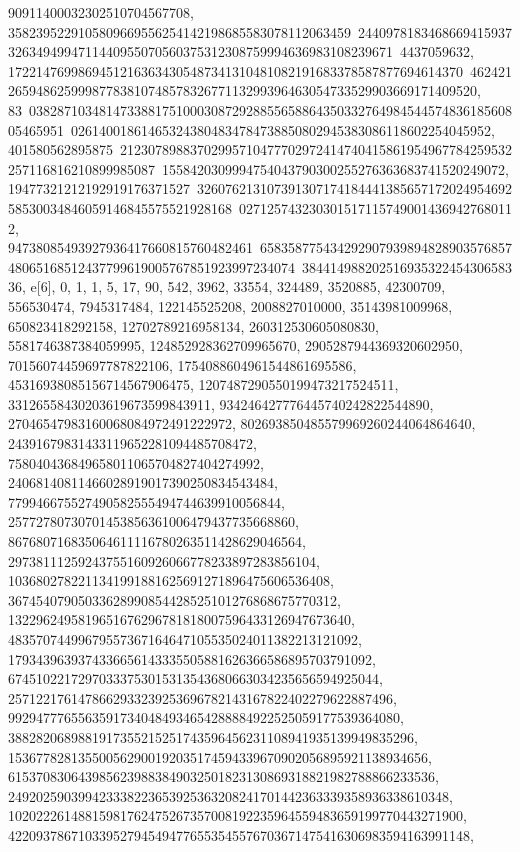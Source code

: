 {{{90911400032302510704567708, 3582395229105809669556254142198685583078112063459\
24409781834686694159373263494994711440955070560375312308759994636983108239671\
4437059632, 17221476998694512163634305487341310481082191683378587877694614370\
4624212659486259998778381074857832677113299396463054733529903669171409520, 83\
03828710348147338817510003087292885565886435033276498454457483618560805465951\
026140018614653243804834784738850802945383086118602254045952, 401580562895875\
21230789883702995710477702972414740415861954967784259532257116816210899985087\
1558420309994754043790300255276363683741520249072, 19477321212192919176371527\
32607621310739130717418444138565717202495469258530034846059146845575521928168\
0271257432303015171157490014369427680112, 94738085493927936417660815760482461\
65835877543429290793989482890357685748065168512437799619005767851923997234074\
38441498820251693532245430658336}}, 
 {e[6], {0, 1, 1, 5, 17, 90, 542, 3962, 33554, 324489, 3520885, 42300709, 
   556530474, 7945317484, 122145525208, 2008827010000, 35143981009968, 
   650823418292158, 12702789216958134, 260312530605080830, 
   5581746387384059995, 124852928362709965670, 2905287944369320602950, 
   70156074459697787822106, 1754088604961544861695586, 
   45316938085156714567906475, 1207487290550199473217524511, 
   33126558430203619673599843911, 934246427776445740242822544890, 
   27046547983160068084972491222972, 802693850485579969260244064864640, 
   24391679831433119652281094485708472, 758040436849658011065704827404274992, 
   24068140811466028919017390250834543484, 
   779946675527490582555494744639910056844, 
   25772780730701453856361006479437735668860, 
   867680716835064611116780263511428629046564, 
   29738111259243755160926066778233897283856104, 
   1036802782211341991881625691271896475606536408, 
   36745407905033628990854428525101276868675770312, 
   1322962495819651676296781818007596433126947673640, 
   48357074499679557367164647105535024011382213121092, 
   1793439639374336656143335505881626366586895703791092, 
   67451022172970333753015313543680663034235656594925044, 
   2571221761478662933239253696782143167822402279622887496, 
   99294777655635917340484934654288884922525059177539364080, 
   3882820689881917355215251743596456231108941935139949835296, 
   153677828135500562900192035174594339670902056895921138934656, 
   6153708306439856239883849032501823130869318821982788866233536, 
   249202590399423338223653925363208241701442363339358936338610348, 
   10202226148815981762475267357008192235964559483659199770443271900, 
   422093786710339527945494776553545576703671475416306983594163991148, 
}}}
